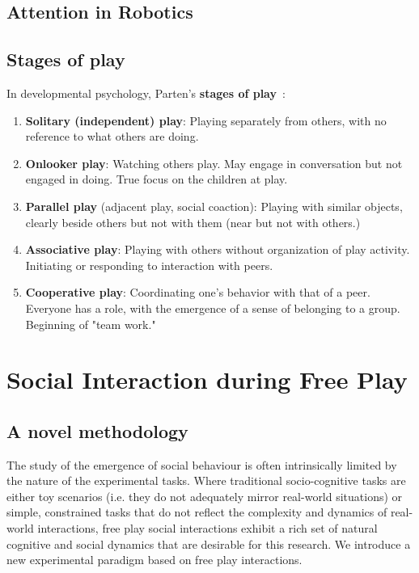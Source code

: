 \documentclass[a4paper]{article}
\newcommand{\ie}{i.e.\xspace}
\begin{document}
\subsection{Attention in Robotics}

\subsection{Stages of play}

In developmental psychology, Parten's {\bf stages of
play}~\cite{parten1932social}:

\begin{enumerate}
    \item {\bf Solitary (independent) play}: Playing separately from
        others, with no reference to what others are doing.
    \item {\bf Onlooker play}: Watching others play. May engage in
        conversation but not engaged in doing. True focus on the children at
        play.
    \item {\bf Parallel play} (adjacent play, social coaction): Playing
        with similar objects, clearly beside others but not with them (near
        but not with others.)
    \item {\bf Associative play}:  Playing with others without
        organization of play activity. Initiating or responding to
        interaction with peers. 
    \item {\bf Cooperative play}: Coordinating one’s behavior with that
        of a peer. Everyone has a role, with the emergence of a sense of
        belonging to a group. Beginning of "team work."
\end{enumerate}



\section{Social Interaction during Free Play}

\subsection{A novel methodology}

The study of the emergence of social behaviour is often intrinsically limited by
the nature of the experimental tasks. Where traditional
socio-cognitive tasks are either toy scenarios (\ie they do not adequately
mirror real-world situations) or simple, constrained tasks that do not reflect
the complexity and dynamics of real-world interactions, free play social
interactions exhibit a rich set of natural cognitive and social dynamics that
are desirable for this research. We introduce a new
experimental paradigm based on free play interactions. 
\end{document}
